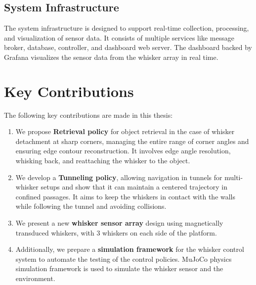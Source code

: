 \subsection{System Infrastructure}
The system infrastructure is designed to support real-time collection, processing, and visualization of sensor data.
It consists of multiple services like message broker, database, controller, and dashboard web server.
The dashboard backed by Grafana visualizes the sensor data from the whisker array in real time.


\section{Key Contributions}
The following key contributions are made in this thesis:
\begin{enumerate}
    \item We propose \textbf{Retrieval policy} for object retrieval in the case of whisker detachment at sharp corners, managing the entire range of corner angles and ensuring edge contour reconstruction.
    It involves edge angle resolution, whisking back, and reattaching the whisker to the object.
    \item We develop a \textbf{Tunneling policy}, allowing navigation in tunnels for multi-whisker setups and show that it can maintain a centered trajectory in confined passages.
    It aims to keep the whiskers in contact with the walls while following the tunnel and avoiding collisions.
    \item We present a new \textbf{whisker sensor array} design using magnetically transduced whiskers, with 3 whiskers on each side of the platform.
    \item Additionally, we prepare a \textbf{simulation framework} for the whisker control system to automate the testing of the control policies.
    MuJoCo physics simulation framework is used to simulate the whisker sensor and the environment.
\end{enumerate}